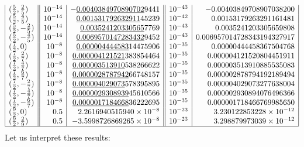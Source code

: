 \documentclass[12pt, a4paper]{article}
\theoremstyle{break}
\begin{document}
\begin{align}
\begin{array}{|l||r|r||r|r|}
(\frac52,\frac25) &    10^{-14} &  -\underline{0.0040384970890702}9441 &  10^{-43} &  -0.00403849708907038200 \\
(\frac52,\frac45) &    10^{-14} &  \underline{0.001531792632911}45239 &  10^{-42} &  0.00153179263291161481 \\
(\frac52,-\frac25) &    10^{-14} &  \underline{0.003524120330565}7769 &  10^{-43} &  0.0035241203305659808 \\
(\frac52,-\frac45) &    10^{-14} & \underline{0.0069570147283432}9452 &  10^{-43} & 0.006957014728343194327917 \\
(\frac72,0) &    10^{-8} &  \underline{0.000004444583}14475906 &  10^{-35} &  0.00000444458367504768 \\
(\frac72,\frac27) &    10^{-8} &  \underline{0.000004121521}383854464 &   10^{-35} &  0.000004121520804451911 \\
(\frac72,\frac47) &    10^{-8} &  \underline{0.000003513910}538266622 &  10^{-35} &  0.000003513910885535083 \\
(\frac72,\frac67) &    10^{-8} &  \underline{0.0000028787942}66748157 &  10^{-35} &  0.000002878794192189494 \\
(\frac72,-\frac27) &    10^{-8} &  \underline{0.000004029073}578395895 &   10^{-35} &  0.000004029073277638004 \\
(\frac72,-\frac47) &    10^{-8} &  \underline{0.0000029308939}45610566 &   10^{-35} &  0.000002930894076496366 \\
(\frac72,-\frac67) &    10^{-8} &  \underline{0.0000017184668}36222695 &  10^{-35} &  0.000001718466769985650\\
(\frac92,0) &    0.5 &  2.2616940515940\times 10^{-8} &  10^{-23} &  3.230122853228 \times 10^{-12}\\
(\frac92,\frac29) &    0.5  & -3.5998726869265\times 10^{-8} &  10^{-23} &  3.298879973039\times 10^{-12} \\
\hline 
\end{array}
\end{align}
Let us interpret these results:
\end{document}
